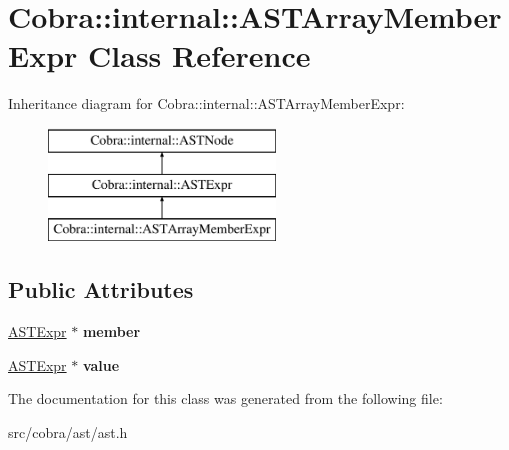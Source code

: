 \hypertarget{class_cobra_1_1internal_1_1_a_s_t_array_member_expr}{\section{Cobra\+:\+:internal\+:\+:A\+S\+T\+Array\+Member\+Expr Class Reference}
\label{class_cobra_1_1internal_1_1_a_s_t_array_member_expr}
}
Inheritance diagram for Cobra\+:\+:internal\+:\+:A\+S\+T\+Array\+Member\+Expr\+:\begin{figure}[H]
\begin{center}
\leavevmode
\includegraphics[height=3.000000cm]{class_cobra_1_1internal_1_1_a_s_t_array_member_expr}
\end{center}
\end{figure}
\subsection*{Public Attributes}
\begin{DoxyCompactItemize}
\item 
\hypertarget{class_cobra_1_1internal_1_1_a_s_t_array_member_expr_a922f6f629046bbc5bdf5b6cc7995855a}{\hyperlink{class_cobra_1_1internal_1_1_a_s_t_expr}{A\+S\+T\+Expr} $\ast$ {\bfseries member}}\label{class_cobra_1_1internal_1_1_a_s_t_array_member_expr_a922f6f629046bbc5bdf5b6cc7995855a}

\item 
\hypertarget{class_cobra_1_1internal_1_1_a_s_t_array_member_expr_a082fbdf58b2a807931a81fda004b86f7}{\hyperlink{class_cobra_1_1internal_1_1_a_s_t_expr}{A\+S\+T\+Expr} $\ast$ {\bfseries value}}\label{class_cobra_1_1internal_1_1_a_s_t_array_member_expr_a082fbdf58b2a807931a81fda004b86f7}

\end{DoxyCompactItemize}


The documentation for this class was generated from the following file\+:\begin{DoxyCompactItemize}
\item 
src/cobra/ast/ast.\+h\end{DoxyCompactItemize}
